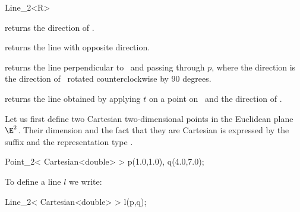 \begin{ccRefClass} {Line_2<R>}
       {}
\ccGlue
{}
       {}
\ccGlue
{}
       {}


       {returns the direction of \ccVar.}

       {returns the line with opposite direction.}

        {returns the line perpendicular to \ccVar\ and passing through $p$,
         where the direction is the direction of \ccVar\ rotated 
         counterclockwise by 90 degrees.}

       {returns the line obtained by applying $t$ on a point on \ccVar\ 
        and the direction of \ccVar.}



\ccExample
Let us first define two Cartesian two-dimensional points in the Euclidean 
plane $\E^2$. Their
dimension and the fact that they are Cartesian is expressed by
the suffix  and the representation type .

\begin{cprog}

  Point_2< Cartesian<double> >  p(1.0,1.0), q(4.0,7.0);
\end{cprog} 

To define a line $l$ we write:

\begin{cprog}

  Line_2< Cartesian<double> > l(p,q);
\end{cprog} 


\end{ccRefClass} 
